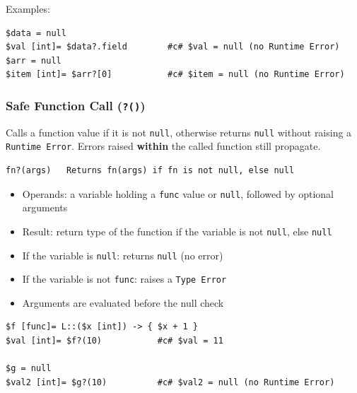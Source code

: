 Examples:
\begin{verbatim}
$data = null
$val [int]= $data?.field        #c# $val = null (no Runtime Error)
$arr = null
$item [int]= $arr?[0]           #c# $item = null (no Runtime Error)
\end{verbatim}

\subsubsection{Safe Function Call (\texttt{?()})}
Calls a function value if it is not \texttt{null}, otherwise returns \texttt{null} without raising a \texttt{Runtime Error}. Errors raised \textbf{within} the called function still propagate.
\begin{verbatim}
fn?(args)   Returns fn(args) if fn is not null, else null
\end{verbatim}
\begin{itemize}
\item Operands: a variable holding a \texttt{func} value or \texttt{null}, followed by optional arguments
\item Result: return type of the function if the variable is not \texttt{null}, else \texttt{null}
\item If the variable is \texttt{null}: returns \texttt{null} (no error)
\item If the variable is not \texttt{func}: raises a \texttt{Type Error}
\item Arguments are evaluated before the null check
\end{itemize}
\begin{verbatim}
$f [func]= L::($x [int]) -> { $x + 1 }
$val [int]= $f?(10)           #c# $val = 11

$g = null
$val2 [int]= $g?(10)          #c# $val2 = null (no Runtime Error)
\end{verbatim}

